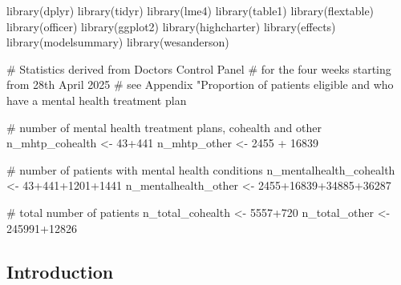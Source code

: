 \documentclass[
  letterpaper,
  DIV=11,
  numbers=noendperiod,
  oneside]{scrartcl}
\newenvironment{Shaded}{\begin{snugshade}}{\end{snugshade}}
\newcommand{\CommentTok}[1]{\textcolor[rgb]{0.37,0.37,0.37}{#1}}
\newcommand{\DecValTok}[1]{\textcolor[rgb]{0.68,0.00,0.00}{#1}}
\newcommand{\FunctionTok}[1]{\textcolor[rgb]{0.28,0.35,0.67}{#1}}
\newcommand{\NormalTok}[1]{\textcolor[rgb]{0.00,0.23,0.31}{#1}}
\newcommand{\OtherTok}[1]{\textcolor[rgb]{0.00,0.23,0.31}{#1}}
\newcommand{\SpecialCharTok}[1]{\textcolor[rgb]{0.37,0.37,0.37}{#1}}
\renewcommand*\contentsname{Table of contents}
\newcommand\contentsname{Table of contents}
\begin{document}
\renewcommand*\contentsname{Table of contents}
{
\hypersetup{linkcolor=}
\setcounter{tocdepth}{3}
\tableofcontents
}

\begin{Shaded}
\begin{Highlighting}[]
\FunctionTok{library}\NormalTok{(dplyr)}
\FunctionTok{library}\NormalTok{(tidyr)}
\FunctionTok{library}\NormalTok{(lme4)}
\FunctionTok{library}\NormalTok{(table1)}
\FunctionTok{library}\NormalTok{(flextable)}
\FunctionTok{library}\NormalTok{(officer)}
\FunctionTok{library}\NormalTok{(ggplot2)}
\FunctionTok{library}\NormalTok{(highcharter)}
\FunctionTok{library}\NormalTok{(effects)}
\FunctionTok{library}\NormalTok{(modelsummary)}
\FunctionTok{library}\NormalTok{(wesanderson)}
\end{Highlighting}
\end{Shaded}

\begin{Shaded}
\begin{Highlighting}[]
\CommentTok{\# Statistics derived from Doctor\textquotesingle{}s Control Panel}
\CommentTok{\# for the four weeks starting from 28th April 2025}
\CommentTok{\# see Appendix "Proportion of patients eligible and who have a mental health treatment plan}

\CommentTok{\# number of mental health treatment plans, cohealth and \textquotesingle{}other\textquotesingle{}}
\NormalTok{n\_mhtp\_cohealth }\OtherTok{\textless{}{-}} \DecValTok{43}\SpecialCharTok{+}\DecValTok{441} 
\NormalTok{n\_mhtp\_other }\OtherTok{\textless{}{-}} \DecValTok{2455} \SpecialCharTok{+} \DecValTok{16839}

\CommentTok{\# number of patients with mental health conditions}
\NormalTok{n\_mentalhealth\_cohealth }\OtherTok{\textless{}{-}} \DecValTok{43}\SpecialCharTok{+}\DecValTok{441}\SpecialCharTok{+}\DecValTok{1201}\SpecialCharTok{+}\DecValTok{1441}
\NormalTok{n\_mentalhealth\_other }\OtherTok{\textless{}{-}} \DecValTok{2455}\SpecialCharTok{+}\DecValTok{16839}\SpecialCharTok{+}\DecValTok{34885}\SpecialCharTok{+}\DecValTok{36287}

\CommentTok{\# total number of patients}
\NormalTok{n\_total\_cohealth }\OtherTok{\textless{}{-}} \DecValTok{5557}\SpecialCharTok{+}\DecValTok{720}
\NormalTok{n\_total\_other }\OtherTok{\textless{}{-}} \DecValTok{245991}\SpecialCharTok{+}\DecValTok{12826}
\end{Highlighting}
\end{Shaded}

\subsection{Introduction}\label{introduction}
\end{document}
